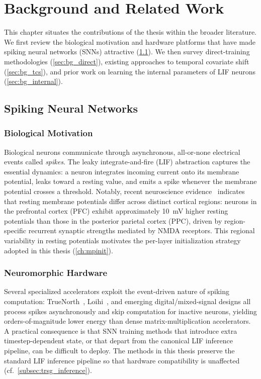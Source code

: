 \chapter{Background and Related Work}
\label{ch:background}

This chapter situates the contributions of the thesis within the broader literature. We first review the biological motivation and hardware platforms that have made spiking neural networks (SNNs) attractive (\cref{sec:bg_snn}). We then survey direct-training methodologies (\cref{sec:bg_direct}), existing approaches to temporal covariate shift (\cref{sec:bg_tcs}), and prior work on learning the internal parameters of LIF neurons (\cref{sec:bg_internal}).

\section{Spiking Neural Networks}
\label{sec:bg_snn}

\subsection{Biological Motivation}
\label{subsec:bg_bio}
Biological neurons communicate through asynchronous, all-or-none electrical events called \emph{spikes}. The leaky integrate-and-fire (LIF) abstraction captures the essential dynamics: a neuron integrates incoming current onto its membrane potential, leaks toward a resting value, and emits a spike whenever the membrane potential crosses a threshold. Notably, recent neuroscience evidence~\cite{yoo:2023} indicates that resting membrane potentials differ across distinct cortical regions: neurons in the prefrontal cortex (PFC) exhibit approximately 10~mV higher resting potentials than those in the posterior parietal cortex (PPC), driven by region-specific recurrent synaptic strengths mediated by NMDA receptors. This regional variability in resting potentials motivates the per-layer initialization strategy adopted in this thesis (\cref{ch:mpinit}).

\subsection{Neuromorphic Hardware}
\label{subsec:bg_hw}
Several specialized accelerators exploit the event-driven nature of spiking computation: TrueNorth~\cite{merolla:2014, akopyan:2015}, Loihi~\cite{davies:2018}, and emerging digital/mixed-signal designs all process spikes asynchronously and skip computation for inactive neurons, yielding orders-of-magnitude lower energy than dense matrix-multiplication accelerators. A practical consequence is that SNN training methods that introduce extra timestep-dependent state, or that depart from the canonical LIF inference pipeline, can be difficult to deploy. The methods in this thesis preserve the standard LIF inference pipeline so that hardware compatibility is unaffected (cf.~\cref{subsec:trsg_inference}).

